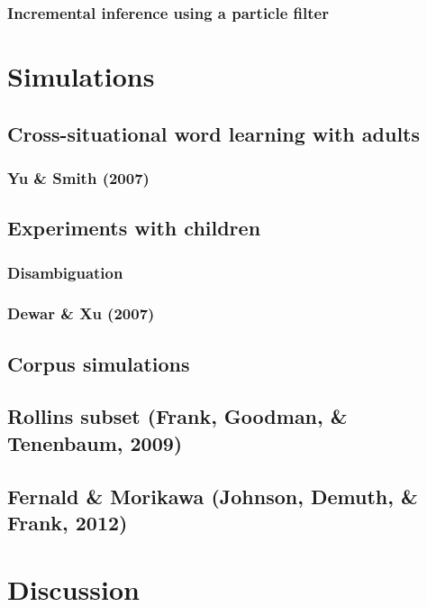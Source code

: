 \documentclass[man,noapacite]{apa2}
\begin{document}
\subsubsection{Incremental inference using a particle filter}

\section{Simulations}

\subsection{Cross-situational word learning with adults}

\subsubsection{Yu \& Smith (2007)}

\subsection{Experiments with children}

\subsubsection{Disambiguation}

\subsubsection{Dewar \& Xu (2007)}


\subsection{Corpus simulations}

\subsection{Rollins subset (Frank, Goodman, \& Tenenbaum, 2009)}

\subsection{Fernald \& Morikawa (Johnson, Demuth, \& Frank, 2012)}

\section{Discussion}

\newpage



\end{document}

